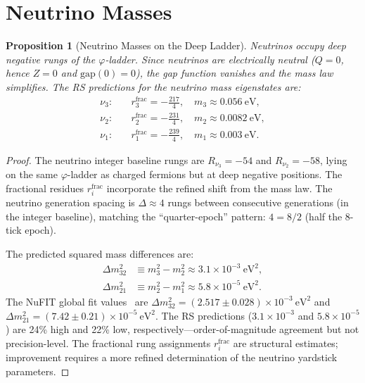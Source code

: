 \documentclass[12pt,a4paper]{article}
\newtheorem{proposition}[theorem]{Proposition}
\theoremstyle{definition}
\theoremstyle{remark}
\begin{document}
\section{Neutrino Masses}
\label{sec:neutrinos}

\begin{proposition}[Neutrino Masses on the Deep Ladder]
\label{prop:neutrino-masses}
Neutrinos occupy deep negative rungs of the $\varphi$-ladder.
Since neutrinos are electrically neutral ($Q = 0$, hence
$Z = 0$ and $\mathrm{gap}(0) = 0$), the gap function vanishes
and the mass law simplifies.  The RS predictions for the
neutrino mass eigenstates are:
\begin{align}
  \nu_3: \quad &r_3^{\mathrm{frac}} = -\tfrac{217}{4},
  \quad m_3 \approx 0.056~\mathrm{eV}, \label{eq:nu3} \\
  \nu_2: \quad &r_2^{\mathrm{frac}} = -\tfrac{231}{4},
  \quad m_2 \approx 0.0082~\mathrm{eV}, \label{eq:nu2} \\
  \nu_1: \quad &r_1^{\mathrm{frac}} = -\tfrac{239}{4},
  \quad m_1 \approx 0.003~\mathrm{eV}. \label{eq:nu1}
\end{align}
\end{proposition}

\begin{proof}
The neutrino integer baseline rungs are $R_{\nu_3} = -54$ and
$R_{\nu_2} = -58$, lying on the same $\varphi$-ladder as
charged fermions but at deep negative positions.  The fractional
residues $r^{\mathrm{frac}}_i$ incorporate the refined shift
from the mass law.  The neutrino generation spacing is
$\Delta \approx 4$ rungs between consecutive generations (in
the integer baseline), matching the ``quarter-epoch'' pattern:
$4 = 8/2$ (half the 8-tick epoch).

The predicted squared mass differences are:
\begin{align}
  \Delta m^2_{32} &\equiv m_3^2 - m_2^2
  \approx 3.1 \times 10^{-3}~\mathrm{eV}^2, \\
  \Delta m^2_{21} &\equiv m_2^2 - m_1^2
  \approx 5.8 \times 10^{-5}~\mathrm{eV}^2.
\end{align}
The NuFIT global fit values~\cite{NuFIT} are
$\Delta m^2_{32} = (2.517 \pm 0.028) \times 10^{-3}~\mathrm{eV}^2$
and
$\Delta m^2_{21} = (7.42 \pm 0.21) \times 10^{-5}~\mathrm{eV}^2$.
The RS predictions ($3.1 \times 10^{-3}$ and $5.8 \times 10^{-5}$)
are 24\% high and 22\% low, respectively---order-of-magnitude agreement
but not precision-level.  The fractional rung assignments $r^{\mathrm{frac}}_i$
are structural estimates; improvement requires a more refined
determination of the neutrino yardstick parameters.
\end{proof}
\end{document}
